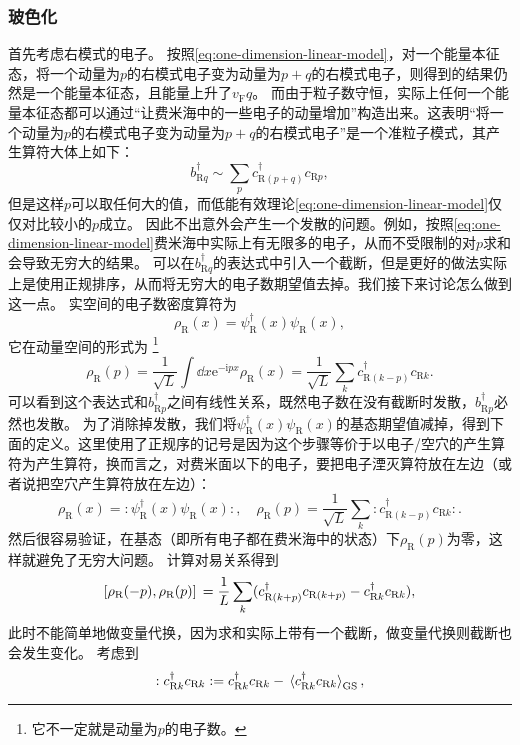 \documentclass[hyperref, UTF8, a4paper]{ctexart}
\newcommand*{\ii}{\mathrm{i}}
\newcommand*{\ee}{\mathrm{e}}
\newcommand*{\normalorder}[1]{: #1 :}
\begin{document}
\subsubsection{玻色化}

首先考虑右模式的电子。
按照\eqref{eq:one-dimension-linear-model}，对一个能量本征态，将一个动量为$p$的右模式电子变为动量为$p+q$的右模式电子，则得到的结果仍然是一个能量本征态，且能量上升了$v_\text{F} q$。
而由于粒子数守恒，实际上任何一个能量本征态都可以通过“让费米海中的一些电子的动量增加”构造出来。这表明“将一个动量为$p$的右模式电子变为动量为$p+q$的右模式电子”是一个准粒子模式，其产生算符大体上如下：
\[
    {b}_{\text{R} q}^\dagger \sim \sum_p {c}^\dagger_{\text{R} (p+q)} {c}_{\text{R} p} ,
\]
但是这样$p$可以取任何大的值，而低能有效理论\eqref{eq:one-dimension-linear-model}仅仅对比较小的$p$成立。
因此不出意外会产生一个发散的问题。例如，按照\eqref{eq:one-dimension-linear-model}费米海中实际上有无限多的电子，从而不受限制的对$p$求和会导致无穷大的结果。
可以在${b}_{\text{R} q}^\dagger$的表达式中引入一个截断，但是更好的做法实际上是使用正规排序，从而将无穷大的电子数期望值去掉。我们接下来讨论怎么做到这一点。
实空间的电子数密度算符为
\[
    {\rho}_\text{R}(x) = {\psi}_\text{R}^\dagger(x) {\psi}_\text{R}(x),
\]
它在动量空间的形式为%
\footnote{它不一定就是动量为$p$的电子数。}%
\[
    {\rho}_\text{R}(p) = \frac{1}{\sqrt{L}} \int \dd{x} \ee^{-\ii p x} {\rho}_\text{R}(x) = \frac{1}{\sqrt{L}} \sum_k {c}^\dagger_{\text{R} (k - p)} {c}_{\text{R} k}.
\]
可以看到这个表达式和${b}^\dagger_{\text{R} p}$之间有线性关系，既然电子数在没有截断时发散，${b}^\dagger_{\text{R} p}$必然也发散。
为了消除掉发散，我们将${\psi}_\text{R}^\dagger(x) {\psi}_\text{R}(x)$的基态期望值减掉，得到下面的定义。这里使用了正规序的记号是因为这个步骤等价于以电子/空穴的产生算符为产生算符，换而言之，对费米面以下的电子，要把电子湮灭算符放在左边（或者说把空穴产生算符放在左边）：
\begin{equation}
    {\rho}_\text{R}(x) = \normalorder{{\psi}_\text{R}^\dagger(x) {\psi}_\text{R}(x)}, \quad {\rho}_\text{R}(p) = \frac{1}{\sqrt{L}} \sum_k \normalorder{{c}^\dagger_{\text{R} (k - p)} {c}_{\text{R} k}}.
\end{equation}
然后很容易验证，在基态（即所有电子都在费米海中的状态）下${\rho}_\text{R}(p)$为零，这样就避免了无穷大问题。
计算对易关系得到
\[
    \comm*{{\rho}_\text{R}(- p)}{{\rho}_\text{R}(p)} = \frac{1}{L} \sum_{k} ({c}^\dagger_{\text{R} (k + p)} {c}_{\text{R} (k + p)} - {c}^\dagger_{\text{R} k} {c}_{\text{R} k}),
\]
此时不能简单地做变量代换，因为求和实际上带有一个截断，做变量代换则截断也会发生变化。
考虑到
\[
    \normalorder{{c}^\dagger_{\text{R} k} {c}_{\text{R} k}} = {c}^\dagger_{\text{R} k} {c}_{\text{R} k} - \expval*{{c}^\dagger_{\text{R} k} {c}_{\text{R} k}}_\text{GS},
\]
\end{document}
